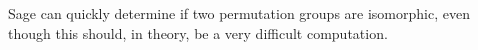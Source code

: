 Sage can quickly determine if two permutation groups are isomorphic, even though this should, in theory, be a very difficult computation.